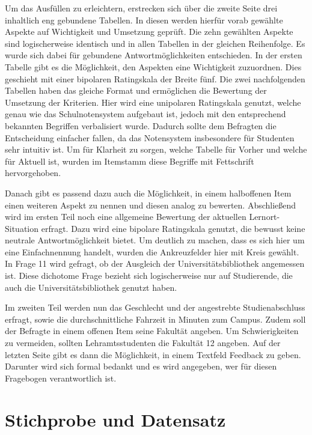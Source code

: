 \documentclass[11pt, a4paper]{article}
\begin{document}
Um das Ausfüllen zu erleichtern, erstrecken sich über die zweite Seite drei inhaltlich eng gebundene Tabellen. In diesen werden hierfür vorab gewählte Aspekte auf Wichtigkeit und Umsetzung geprüft. Die zehn gewählten Aspekte sind logischerweise identisch und in allen Tabellen in der gleichen Reihenfolge.
Es wurde sich dabei für gebundene Antwortmöglichkeiten entschieden.
In der ersten Tabelle gibt es die Möglichkeit, den Aspekten eine Wichtigkeit zuzuordnen. Dies geschieht mit einer bipolaren Ratingskala der Breite fünf.
Die zwei nachfolgenden Tabellen haben das gleiche Format und ermöglichen die Bewertung der Umsetzung der Kriterien. Hier wird eine unipolaren Ratingskala genutzt, welche genau wie das Schulnotensystem aufgebaut ist, jedoch 
mit den entsprechend bekannten Begriffen verbalisiert wurde.
Dadurch sollte dem Befragten die Entscheidung einfacher fallen, da das Notensystem insbesondere für Studenten sehr intuitiv ist.
Um für Klarheit zu sorgen, welche Tabelle für Vorher und welche für Aktuell ist, wurden im Itemstamm diese Begriffe mit Fettschrift hervorgehoben.

Danach gibt es passend dazu auch die Möglichkeit, in einem halboffenen Item einen weiteren Aspekt zu nennen und diesen analog zu bewerten.
Abschließend wird im ersten Teil noch eine allgemeine Bewertung der aktuellen Lernort-Situation erfragt.
Dazu wird eine bipolare Ratingskala genutzt, die bewusst keine neutrale Antwortmöglichkeit bietet.
Um deutlich zu machen, dass es sich hier um eine Einfachnennung handelt, wurden die Ankreuzfelder hier mit Kreis gewählt.
In Frage 11 wird gefragt, ob der Ausgleich der Universitätsbibliothek angemessen ist. Diese dichotome Frage bezieht sich logischerweise nur auf Studierende, die auch die Universitätsbibliothek genutzt haben. 

Im zweiten Teil werden nun das Geschlecht und der angestrebte Studienabschluss erfragt, sowie die durchschnittliche Fahrzeit in Minuten zum Campus.
Zudem soll der Befragte in einem offenen Item seine Fakultät angeben.
Um Schwierigkeiten zu vermeiden, sollten Lehramtsstudenten die Fakultät 12 angeben.
Auf der letzten Seite gibt es dann die Möglichkeit, in einem Textfeld Feedback zu geben.
Darunter wird sich formal bedankt und es wird angegeben, wer für diesen Fragebogen verantwortlich ist.
\newpage
\section{Stichprobe und Datensatz}
\label{Stichprobe und Datensatz}
\end{document}
